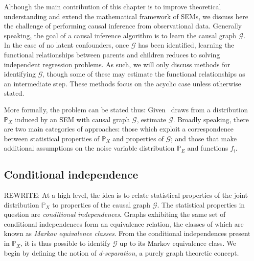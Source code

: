 Although the main contribution of this chapter is to improve theoretical understanding and extend the mathematical framework of SEMs, we discuss here the challenge of performing causal inference from observational data. %
Generally speaking, the goal of a causal inference algorithm is to learn the causal graph $\mathcal{G}$. 
In the case of no latent confounders, once $\mathcal{G}$ has been identified, learning the functional relationships between parents and children reduces to solving independent regression problems. As such, we will only discuss methods for identifying $\mathcal{G}$, though some of these may estimate the functional relationships as an intermediate step.
These methods focus on the acyclic case unless otherwise stated.

More formally, the problem can be stated thus: Given \iid~draws from a distribution $\mathbb{P}_X$ induced by an SEM with causal graph $\mathcal{G}$, estimate $\mathcal{G}$.
Broadly speaking, there are two main categories of approaches: those which exploit a correspondence between statistical properties of $\mathbb{P}_X$ and properties of $\mathcal{G}$; and those that make additional assumptions on the noise variable distribution $\mathbb{P}_E$ and functions $f_i$.

\subsection{Conditional independence}

REWRITE:
At a high level, the idea is to relate statistical properties of the joint distribution $\mathbb{P}_X$ to properties of the causal graph $\mathcal{G}$.
The statistical properties in question are \emph{conditional independences}.
Graphs exhibiting the same set of conditional independences form an equivalence relation, the classes of which are known as \emph{Markov equivalence classes}.
From the conditional independences present in $\mathbb{P}_X$, it is thus possible to identify $\mathcal{G}$ up to its Markov equivalence class.
We begin by defining the notion of \emph{d-separation}, a purely graph theoretic concept. 
\\


